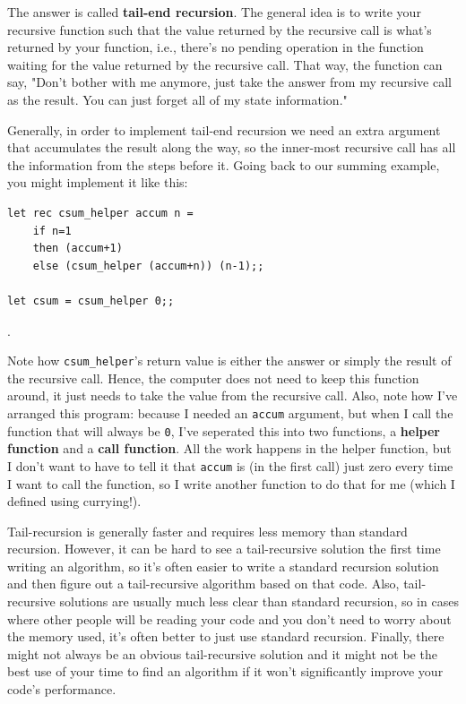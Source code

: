 \documentclass[10pt]{book}
\begin{document}
The answer is called {\bf tail-end recursion}. The general idea is to write
your recursive function such that the value returned by the recursive call 
is what's returned by your function, i.e., there's no pending operation 
in the function waiting for the value returned by the recursive call. That 
way, the function can say, "Don't bother with me anymore, just take the answer 
from my recursive call as the result. You can just forget all of my state 
information."

Generally, in order to implement tail-end recursion we need an extra argument 
that accumulates the result along the way, so the inner-most recursive call
has all the information from the steps before it. Going back to our summing 
example, you might implement it like this:

\beforeverb
\begin{verbatim}
let rec csum_helper accum n = 
	if n=1
	then (accum+1)
	else (csum_helper (accum+n)) (n-1);;

let csum = csum_helper 0;;
\end{verbatim}
\afterverb.

Note how {\tt \verb"csum_helper"}'s return value is either the answer or simply the 
result of the recursive call. Hence, the computer does not need to keep this 
function around, it just needs to take the value from the recursive call. Also, 
note how I've arranged this program: because I needed an {\tt accum} argument, 
but when I call the function that will always be {\tt 0}, I've seperated this 
into two functions, a {\bf helper function} and a {\bf call function}. All the 
work happens in the helper function, but I don't want to have to tell it that
{\tt accum} is (in the first call) just zero every time I want to call the 
function, so I write another function to do that for me (which I defined using
currying!).

Tail-recursion is generally faster and requires less memory than standard recursion. 
However, it can be hard to see a tail-recursive solution the first time writing an 
algorithm, so it's often easier to write a standard recursion solution and then figure 
out a tail-recursive algorithm based on that code. Also, tail-recursive solutions are 
usually much less clear than standard recursion, so in cases where other people will be 
reading your code and you don't need to worry about the memory used, it's often better 
to just use standard recursion. Finally, there might not always be an obvious tail-recursive
solution and it might not be the best use of your time to find an algorithm if it won't 
significantly improve your code's performance.
\end{document}

